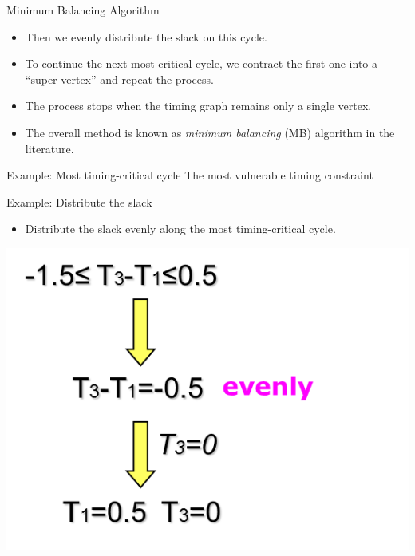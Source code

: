 \documentclass[
  ignorenonframetext,
]{beamer}
\providecommand{\tightlist}{%
  \setlength{\itemsep}{0pt}\setlength{\parskip}{0pt}}
\begin{document}
\begin{frame}{Minimum Balancing Algorithm}
\protect\hypertarget{minimum-balancing-algorithm}{}
\begin{itemize}
\tightlist
\item
  Then we evenly distribute the slack on this cycle.
\item
  To continue the next most critical cycle, we contract the first one
  into a ``super vertex'' and repeat the process.
\item
  The process stops when the timing graph remains only a single vertex.
\item
  The overall method is known as \emph{minimum balancing} (MB) algorithm
  in the literature.
\end{itemize}
\end{frame}

\begin{frame}{Example: Most timing-critical cycle}
\protect\hypertarget{example-most-timing-critical-cycle}{}
The most vulnerable timing constraint


\end{frame}

\begin{frame}{Example: Distribute the slack}
\protect\hypertarget{example-distribute-the-slack}{}
\begin{itemize}
\tightlist
\item
  Distribute the slack evenly along the most timing-critical cycle.
\end{itemize}

\columnsbegin
{}

\pause
{}

\includegraphics{lec05.files/fig10.png}\\
\columnsend
\end{frame}
\end{document}
